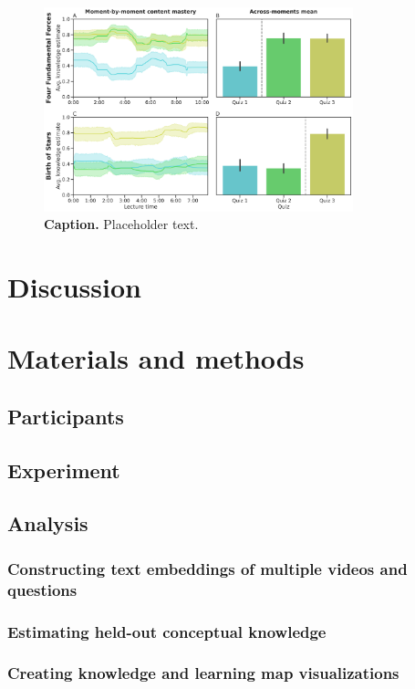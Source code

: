 \documentclass[10pt]{article}
\begin{document}
\begin{figure}[tp]
\centering
\includegraphics[width=0.8\textwidth]{figs/content-mastery}
\caption{\textbf{Caption.} Placeholder text.}
\label{fig:demo}
\end{figure}

\section*{Discussion}

\section*{Materials and methods}

\subsection*{Participants}

\subsection*{Experiment}

\subsection*{Analysis}

\subsubsection*{Constructing text embeddings of multiple videos and questions}

\subsubsection*{Estimating held-out conceptual knowledge}

\subsubsection*{Creating knowledge and learning map visualizations}





\end{document}
